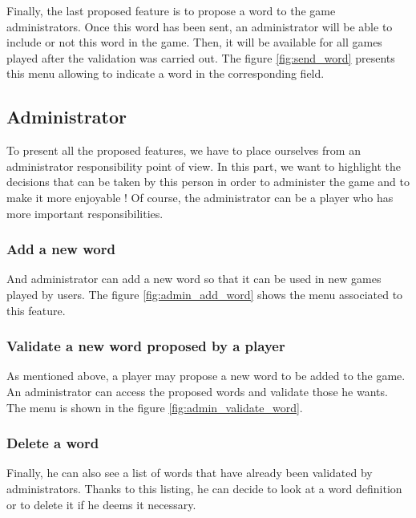 \documentclass{tnreport}
\begin{document}
Finally, the last proposed feature is to propose a word to the game administrators. Once this word has been sent, an administrator will be able to include or not this word in the game. Then, it will be available for all games played after the validation was carried out. The figure \ref{fig:send_word} presents this menu allowing to indicate a word in the corresponding field. 

\subsection{Administrator}

To present all the proposed features, we have to place ourselves from an administrator responsibility point of view. In this part, we want to highlight the decisions that can be taken by this person in order to administer the game and to make it more enjoyable ! Of course, the administrator can be a player who has more important responsibilities. 

\subsubsection{Add a new word}

And administrator can add a new word so that it can be used in new games played by users. The figure \ref{fig:admin_add_word} shows the menu associated to this feature. 

\subsubsection{Validate a new word proposed by a player}

As mentioned above, a player may propose a new word to be added to the game. An administrator can access the proposed words and validate those he wants. The menu is shown in the figure \ref{fig:admin_validate_word}. 

\subsubsection{Delete a word}

Finally, he can also see a list of words that have already been validated by administrators. Thanks to this listing, he can decide to look at a word definition or to delete it if he deems it necessary. 

\bigskip
\end{document}

